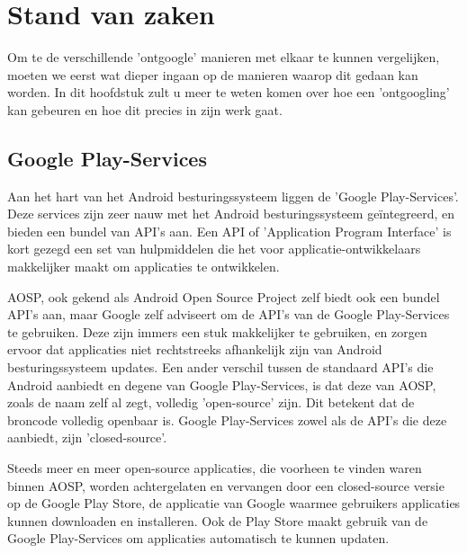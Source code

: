 \chapter{Stand van zaken}
\label{ch:stand-van-zaken}



Om te de verschillende 'ontgoogle' manieren met elkaar te kunnen vergelijken, moeten we eerst wat dieper ingaan op de manieren waarop dit gedaan kan worden. In dit hoofdstuk zult u meer te weten komen over hoe een 'ontgoogling' kan gebeuren en hoe dit precies in zijn werk gaat.

\section{Google Play-Services}
Aan het hart van het Android besturingssysteem liggen de 'Google Play-Services'. Deze services zijn zeer nauw met het Android besturingssysteem geïntegreerd, en bieden een bundel van API's aan. Een API of 'Application Program Interface' is kort gezegd een set van hulpmiddelen die het voor applicatie-ontwikkelaars makkelijker maakt om applicaties te ontwikkelen.

AOSP, ook gekend als Android Open Source Project zelf biedt ook een bundel API's  aan, maar Google zelf adviseert om de API's van de Google Play-Services te gebruiken. Deze zijn immers een stuk makkelijker te gebruiken, en zorgen ervoor dat applicaties niet rechtstreeks afhankelijk zijn van Android besturingssysteem updates. Een ander verschil tussen de standaard API's die Android aanbiedt en degene van Google Play-Services, is dat deze van AOSP, zoals de naam zelf al zegt, volledig 'open-source' zijn. Dit betekent dat de broncode volledig openbaar is. Google Play-Services zowel als de API's die deze aanbiedt, zijn 'closed-source'.

Steeds meer en meer open-source applicaties, die voorheen te vinden waren binnen AOSP, worden achtergelaten en vervangen door een closed-source versie op de Google Play Store, de applicatie van Google waarmee gebruikers applicaties kunnen downloaden en installeren. Ook de Play Store maakt gebruik van de Google Play-Services om applicaties automatisch te kunnen updaten.

